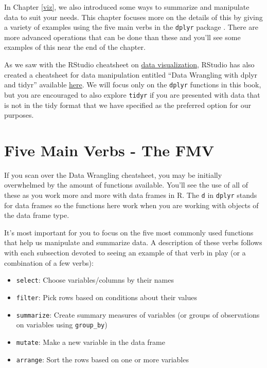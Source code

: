 \documentclass[]{tufte-book}
\providecommand{\tightlist}{%
  \setlength{\itemsep}{0pt}\setlength{\parskip}{0pt}}
\begin{document}
In Chapter \ref{viz}, we also introduced some ways to summarize and
manipulate data to suit your needs. This chapter focuses more on the
details of this by giving a variety of examples using the five main
verbs in the \texttt{dplyr} package \citep{R-dplyr}. There are more
advanced operations that can be done than these and you'll see some
examples of this near the end of the chapter.

As we saw with the RStudio cheatsheet on
\href{https://www.rstudio.com/wp-content/uploads/2015/12/ggplot2-cheatsheet-2.0.pdf}{data
visualization}, RStudio has also created a cheatsheet for data
manipulation entitled ``Data Wrangling with dplyr and tidyr'' available
\href{https://www.rstudio.com/wp-content/uploads/2015/02/data-wrangling-cheatsheet.pdf}{here}.
We will focus only on the \texttt{dplyr} functions in this book, but you
are encouraged to also explore \texttt{tidyr} if you are presented with
data that is not in the tidy format that we have specified as the
preferred option for our purposes.

\section{Five Main Verbs - The FMV}\label{five-main-verbs---the-fmv}

If you scan over the Data Wrangling cheatsheet, you may be initially
overwhelmed by the amount of functions available. You'll see the use of
all of these as you work more and more with data frames in R. The
\texttt{d} in \texttt{dplyr} stands for data frames so the functions
here work when you are working with objects of the data frame type.

It's most important for you to focus on the five most commonly used
functions that help us manipulate and summarize data. A description of
these verbs follows with each subsection devoted to seeing an example of
that verb in play (or a combination of a few verbs):

\begin{itemize}
\tightlist
\item
  \texttt{select}: Choose variables/columns by their names
\item
  \texttt{filter}: Pick rows based on conditions about their values
\item
  \texttt{summarize}: Create summary measures of variables (or groups of
  observations on variables using \texttt{group\_by})
\item
  \texttt{mutate}: Make a new variable in the data frame
\item
  \texttt{arrange}: Sort the rows based on one or more variables
\end{itemize}
\end{document}
